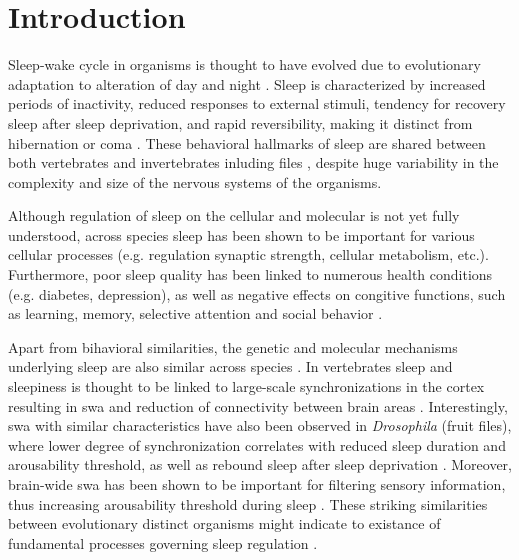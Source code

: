 \documentclass[../main.tex]{subfiles}
\begin{document}
\section{Introduction} \label{sec:introduction}

Sleep-wake cycle in organisms is thought to have evolved due to evolutionary
adaptation to alteration of day and night \cite{suarez-grimaltNeuralArchitectureSleep2021}.
Sleep is characterized by increased periods of inactivity, reduced responses to external stimuli,
tendency for recovery sleep after sleep deprivation, and rapid reversibility, making it
distinct from hibernation or coma
\cite{shaferRegulationDrosophilaSleep2021,andreaniCircadianProgrammingEllipsoid2022,donleaRecurrentCircuitryBalancing2018}.
These behavioral hallmarks of sleep are shared between both vertebrates and invertebrates
inluding files \cite{shaferRegulationDrosophilaSleep2021,andreaniCircadianProgrammingEllipsoid2022},
despite huge variability in the complexity and size of the nervous systems of the organisms.

Although regulation of sleep on the cellular and molecular is not yet fully understood,
across species sleep has been shown to be important for various cellular processes
(e.g. regulation synaptic strength, cellular metabolism, etc.). Furthermore,
poor sleep quality has been linked to numerous health conditions (e.g. diabetes, depression),
as well as negative effects on congitive functions, such as learning, memory,
selective attention and social behavior \cite{shaferRegulationDrosophilaSleep2021,dubowyCircadianRhythmsSleep2017,suarez-grimaltNeuralArchitectureSleep2021}.

Apart from bihavioral similarities, the genetic and molecular mechanisms underlying
sleep are also similar across species \cite{dubowyCircadianRhythmsSleep2017}.
In vertebrates sleep and sleepiness is thought to be linked to large-scale synchronizations in the cortex
resulting in \gls{swa} and reduction of connectivity between brain areas \cite{suarez-grimaltNeuralArchitectureSleep2021,raccugliaNetworkSpecificSynchronizationElectrical2019}.
Interestingly, \gls{swa} with similar characteristics have also been observed in \textit{Drosophila} (fruit files),
where lower degree of synchronization correlates with reduced sleep duration and arousability
threshold, as well as rebound sleep after sleep deprivation
\cite{raccugliaNetworkSpecificSynchronizationElectrical2019}. Moreover, brain-wide
\gls{swa} has been shown to be important for filtering sensory information, thus increasing
arousability threshold during sleep \cite{raccugliaCoherentMultilevelNetwork2022}. These
striking similarities between evolutionary distinct organisms might indicate to existance of
fundamental processes governing sleep regulation \cite{suarez-grimaltNeuralArchitectureSleep2021}.
\end{document}
